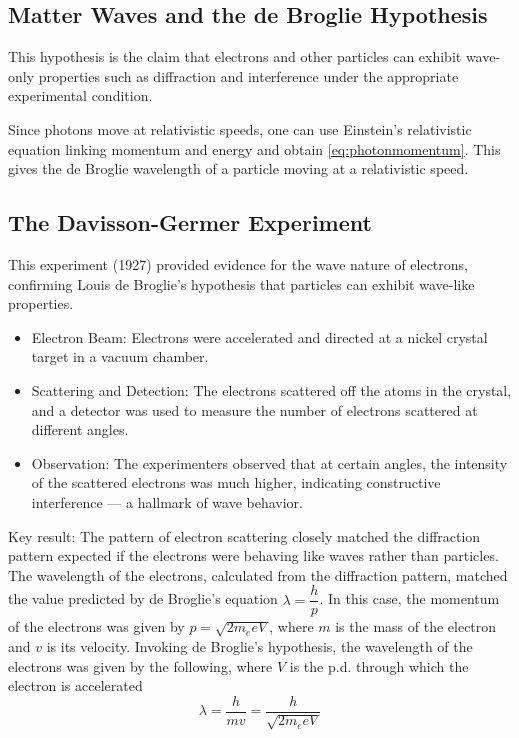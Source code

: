\documentclass[a4paper,12pt]{article}
\begin{document}
\pagebreak

\subsection{Matter Waves and the de Broglie Hypothesis}

This hypothesis is the claim that electrons and other particles can exhibit wave-only properties such as diffraction and interference under the appropriate experimental condition.

Since photons move at relativistic speeds, one can use Einstein's relativistic equation linking momentum and energy and obtain \cref{eq:photonmomentum}. This gives the de Broglie wavelength of a particle moving at a relativistic speed.

\subsection{The Davisson-Germer Experiment}

This experiment (1927) provided evidence for the wave nature of electrons, confirming Louis de Broglie's hypothesis that particles can exhibit wave-like properties.


\begin{itemize}
  \item Electron Beam: Electrons were accelerated and directed at a nickel crystal target in a vacuum chamber.
  \item Scattering and Detection: The electrons scattered off the atoms in the crystal, and a detector was used to measure the number of electrons scattered at different angles.
  \item Observation: The experimenters observed that at certain angles, the intensity of the scattered electrons was much higher, indicating constructive interference — a hallmark of wave behavior.
\end{itemize}

Key result:
The pattern of electron scattering closely matched the diffraction pattern expected if the electrons were behaving like waves rather than particles. The wavelength of the electrons, calculated from the diffraction pattern, matched the value predicted by de Broglie's equation $\lambda = \dfrac{h}{p}$.
In this case, the momentum of the electrons was given by $p = \sqrt{2m_eeV}$, where $m$ is the mass of the electron and $v$ is its velocity. Invoking de Broglie's hypothesis, the wavelength of the electrons was given by the following, where $V$ is the p.d. through which the electron is accelerated \begin{equation}\label{eq:davisson}
  \lambda = \frac{h}{mv} = \frac{h}{\sqrt{2m_eeV}}
\end{equation}
\end{document}
